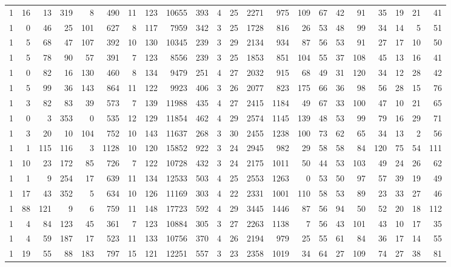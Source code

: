 {\begin{landscape}
\begin{longtable}[c]{lrrrrrrrrrrrrrrrrrrrrr}
1 & 16 & 13 & 319 & 8 & 490 & 11 & 123 & 10655 & 393 & 4 & 25 & 2271 & 975 & 109 & 67 & 42 & 91 & 35 & 19 & 21 & 41 \\
1 & 0 & 46 & 25 & 101 & 627 & 8 & 117 & 7959 & 342 & 3 & 25 & 1728 & 816 & 26 & 53 & 48 & 99 & 34 & 14 & 5 & 51 \\
1 & 5 & 68 & 47 & 107 & 392 & 10 & 130 & 10345 & 239 & 3 & 29 & 2134 & 934 & 87 & 56 & 53 & 91 & 27 & 17 & 10 & 50 \\
1 & 5 & 78 & 90 & 57 & 391 & 7 & 123 & 8556 & 239 & 3 & 25 & 1853 & 851 & 104 & 55 & 37 & 108 & 45 & 13 & 16 & 41 \\
1 & 0 & 82 & 16 & 130 & 460 & 8 & 134 & 9479 & 251 & 4 & 27 & 2032 & 915 & 68 & 49 & 31 & 120 & 34 & 12 & 28 & 42 \\
1 & 5 & 99 & 36 & 143 & 864 & 11 & 122 & 9923 & 406 & 3 & 26 & 2077 & 823 & 175 & 66 & 36 & 98 & 56 & 28 & 15 & 76 \\
1 & 3 & 82 & 83 & 39 & 573 & 7 & 139 & 11988 & 435 & 4 & 27 & 2415 & 1184 & 49 & 67 & 33 & 100 & 47 & 10 & 21 & 65 \\
1 & 0 & 3 & 353 & 0 & 535 & 12 & 129 & 11854 & 462 & 4 & 29 & 2574 & 1145 & 139 & 48 & 53 & 99 & 79 & 16 & 29 & 71 \\
1 & 3 & 20 & 10 & 104 & 752 & 10 & 143 & 11637 & 268 & 3 & 30 & 2455 & 1238 & 100 & 73 & 62 & 65 & 34 & 13 & 2 & 56 \\
1 & 1 & 115 & 116 & 3 & 1128 & 10 & 120 & 15852 & 922 & 3 & 24 & 2945 & 982 & 29 & 58 & 58 & 84 & 120 & 75 & 54 & 111 \\
1 & 10 & 23 & 172 & 85 & 726 & 7 & 122 & 10728 & 432 & 3 & 24 & 2175 & 1011 & 50 & 44 & 53 & 103 & 49 & 24 & 26 & 62 \\
1 & 1 & 9 & 254 & 17 & 639 & 11 & 134 & 12533 & 503 & 4 & 25 & 2553 & 1263 & 0 & 53 & 50 & 97 & 57 & 39 & 19 & 49 \\
1 & 17 & 43 & 352 & 5 & 634 & 10 & 126 & 11169 & 303 & 4 & 22 & 2331 & 1001 & 110 & 58 & 53 & 89 & 23 & 33 & 27 & 46 \\
1 & 88 & 121 & 9 & 6 & 759 & 11 & 148 & 17723 & 592 & 4 & 29 & 3445 & 1446 & 87 & 56 & 94 & 50 & 52 & 20 & 18 & 112 \\
1 & 4 & 84 & 123 & 45 & 361 & 7 & 123 & 10884 & 305 & 3 & 27 & 2263 & 1138 & 7 & 56 & 43 & 101 & 43 & 10 & 17 & 35 \\
1 & 4 & 59 & 187 & 17 & 523 & 11 & 133 & 10756 & 370 & 4 & 26 & 2194 & 979 & 25 & 55 & 61 & 84 & 36 & 17 & 14 & 55 \\
1 & 19 & 55 & 88 & 183 & 797 & 15 & 121 & 12251 & 557 & 3 & 23 & 2358 & 1019 & 34 & 64 & 27 & 109 & 74 & 27 & 38 & 81 \\

\end{longtable}
\end{landscape}}
